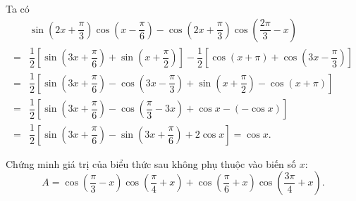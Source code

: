 \begin{bt}[VDT]
{\begin{enumerate}
			Ta có
\begin{align*}
&\sin \left(2x+\dfrac{\pi}{3}\right)\cos \left(x-\dfrac{\pi}{6}\right)-\cos \left(2x+\dfrac{\pi}{3}\right)\cos \left(\dfrac{2\pi}{3}-x\right)\\
=&\dfrac{1}{2}\left[\sin \left(3x+\dfrac{\pi}{6}\right)+\sin \left(x+\dfrac{\pi}{2}\right)\right]-\dfrac{1}{2}\left[\cos\left(x+\pi \right)+\cos \left(3x-\dfrac{\pi}{3} \right) \right]\\
=&\dfrac{1}{2}\left[\sin \left(3x+\dfrac{\pi}{6} \right)-\cos \left(3x-\dfrac{\pi}{3} \right) +\sin \left(x+\dfrac{\pi}{2} \right) -\cos \left(x+\pi \right) \right]\\
=&\dfrac{1}{2}\left[\sin \left(3x+\dfrac{\pi}{6} \right)-\cos \left(\dfrac{\pi}{3} -3x \right) +\cos x - (-\cos x) \right]\\
=&\dfrac{1}{2}\left[\sin \left(3x+\dfrac{\pi}{6} \right) - \sin \left(3x+\dfrac{\pi}{6} \right) + 2\cos x \right] = \cos x.
\end{align*}
\end{enumerate}
}
\end{bt}

\begin{bt}[VDT]
Chứng minh giá trị của biểu thức sau không phụ thuộc vào biến số $x$:
$$A=\cos \left(\dfrac{\pi}{3}-x\right)\cos \left(\dfrac{\pi}{4}+x\right)+\cos \left(\dfrac{\pi}{6}+x\right)\cos \left(\dfrac{3\pi}{4}+x\right).$$
\end{bt}

